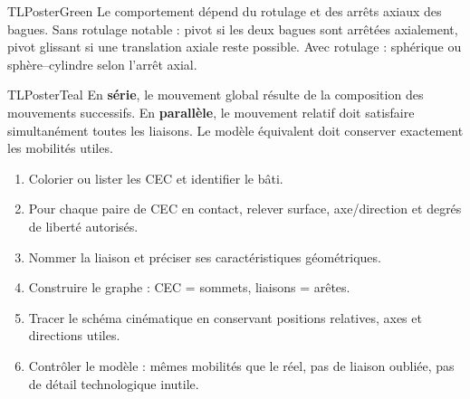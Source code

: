 \documentclass[10pt,a3paper]{article}
\begin{document}
\begin{minipage}[t]{0.49\linewidth}
\begin{TLPosterBloc}{TLPosterGreen}
Le comportement dépend du rotulage et des arrêts axiaux des bagues. Sans rotulage notable : pivot si les deux bagues sont arrêtées axialement, pivot glissant si une translation axiale reste possible. Avec rotulage : sphérique ou sphère--cylindre selon l'arrêt axial.
\end{TLPosterBloc}
\begin{TLPosterBloc}{TLPosterTeal}
En \textbf{série}, le mouvement global résulte de la composition des mouvements successifs. En \textbf{parallèle}, le mouvement relatif doit satisfaire simultanément toutes les liaisons. Le modèle équivalent doit conserver exactement les mobilités utiles.
\end{TLPosterBloc}
\end{minipage}
\vfill
\begin{TLPosterMethode}
\begin{enumerate}
  \item Colorier ou lister les CEC et identifier le bâti.
  \item Pour chaque paire de CEC en contact, relever surface, axe/direction et degrés de liberté autorisés.
  \item Nommer la liaison et préciser ses caractéristiques géométriques.
  \item Construire le graphe : CEC = sommets, liaisons = arêtes.
  \item Tracer le schéma cinématique en conservant positions relatives, axes et directions utiles.
  \item Contrôler le modèle : mêmes mobilités que le réel, pas de liaison oubliée, pas de détail technologique inutile.
\end{enumerate}
\end{TLPosterMethode}
\vfill
{}
\end{document}
